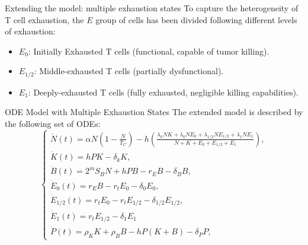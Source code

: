 \documentclass[aspectratio=169,xcolor=dvipsnames]{beamer}
\begin{document}
\begin{frame}{Extending the model: multiple exhaustion states}
    To capture the heterogeneity of T cell exhaustion, the $E$ group of cells has been divided following different levels of exhaustion:
    \begin{itemize}
        \item $E_0$: Initially Exhausted T cells (functional, capable of tumor killing).
        \item $E_{1/2}$: Middle-exhausted T cells (partially dysfunctional).
        \item $E_1$: Deeply-exhausted T cells (fully exhausted, negligible killing capabilities).
    \end{itemize}
    \vspace{0.2cm}
\end{frame}

\begin{frame}{ODE Model with Multiple Exhaustion States}
    The extended model is described by the following set of ODEs:
    \begin{equation}
\begin{cases}
    \dot{N}(t) = \alpha N \left(1 - \frac{N}{T_C}\right) - h \left( \frac{\lambda_k N K + \lambda_0 N E_0 + \lambda_{1/2} N E_{1/2} + \lambda_1 N E_1}{N + K + E_0 + E_{1/2} + E_1} \right), \\[2ex]
    \dot{K}(t) = h P K - \delta_k K, \\[2ex]
    \dot{B}(t) = 2^m S_B N + h P B - r_E B - \delta_B B, \\[2ex]
    \dot{E}_0(t) = r_E B - r_t E_0 - \delta_0 E_0, \\[2ex]
    \dot{E}_{1/2}(t) = r_t E_0 - r_t E_{1/2} - \delta_{1/2} E_{1/2}, \\[2ex]
    \dot{E}_1(t) = r_t E_{1/2} - \delta_1 E_1\\[2ex]
    \dot{P}(t) = \rho_K K + \rho_B B - h P (K + B) - \delta_P P,
\end{cases}
\end{equation}
\end{frame}
\end{document}
